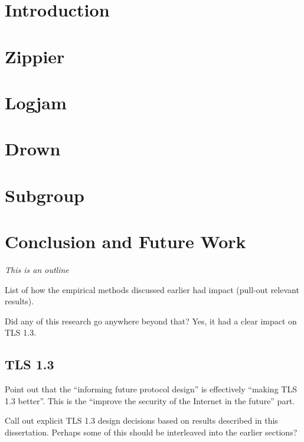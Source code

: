 





\chapter{Introduction}


\chapter{Zippier}
\label{chapter:zippier}

\chapter{Logjam}
\label{chapter:logjam}

\chapter{Drown}
\label{chapter:drown}

\chapter{Subgroup}
\label{chapter:subgroup}


\chapter{Conclusion and Future Work}
\label{chapter:conclusion}

\textit{This is an outline}

List of how the empirical methods discussed earlier had impact
(pull-out relevant results).

Did any of this research go anywhere beyond that? Yes, it had a clear impact
on TLS 1.3.

\section{TLS 1.3}

Point out that the ``informing future protocol design'' is effectively
``making TLS 1.3 better''. This is the ``improve the security of the Internet
in the future'' part.

Call out explicit TLS 1.3 design decisions based on results described in this
dissertation. Perhaps some of this should be interleaved into the earlier
sections?

